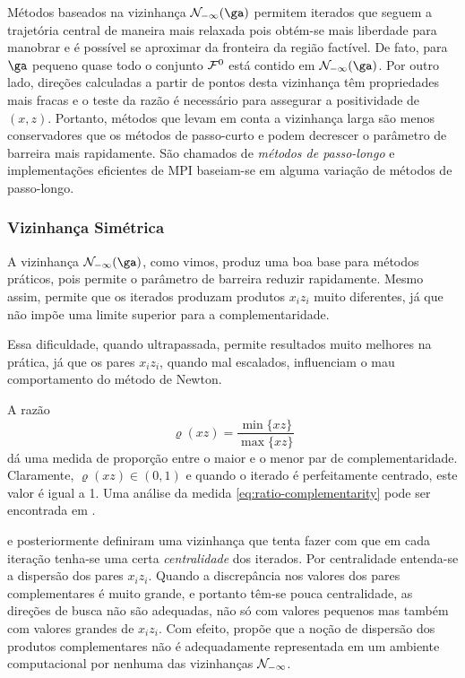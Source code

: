  
 Métodos baseados na vizinhança $\Nset_{-\infty}(\ga)$ permitem iterados que
 seguem a trajetória central de maneira mais relaxada  pois obtém-se mais
 liberdade para manobrar e é possível se aproximar da fronteira da região
 factível. De fato, para $\ga$ pequeno quase todo o conjunto $\mathcal{F}^0$ está
 contido em $\Nset_{-\infty}(\ga)$. Por outro lado, direções calculadas a partir
 de pontos desta vizinhança têm propriedades mais fracas e o teste da razão é
 necessário para assegurar a positividade de $(x,z)$. Portanto, métodos que
 levam em conta a vizinhança larga são menos conservadores que os métodos de
 passo-curto e podem decrescer o parâmetro de barreira mais rapidamente. São
 chamados de \emph{métodos de passo-longo}  e implementações eficientes de
 \ac{MPI} baseiam-se em alguma variação de métodos de passo-longo.
 
 \subsubsection{Vizinhança Simétrica}
\label{sec:symmetric-neig}  
 A vizinhança $\Nset_{-\infty}(\ga)$, como vimos,  produz uma boa base para
 métodos práticos, pois permite o parâmetro de barreira reduzir rapidamente.
 Mesmo assim, permite que os iterados produzam produtos $x_iz_i$ muito
 diferentes, já que não impõe uma limite superior para a complementaridade.
 
 Essa dificuldade, quando ultrapassada, permite resultados muito melhores na
 prática, já que os pares $x_iz_i$, quando mal escalados, influenciam o mau
 comportamento do método de Newton.
 
 A razão 
\begin{equation}
\label{eq:ratio-complementarity}
\varrho(xz) = \frac{\min\{xz\}}{\max\{xz\}}
\end{equation}
dá uma medida de proporção entre o maior e o menor par de complementaridade.
 Claramente, $\varrho(xz)\in(0,1)$ e quando o iterado é perfeitamente
centrado, este valor é igual a 1. Uma
análise da medida \eqref{eq:ratio-complementarity} pode ser encontrada em
\textcite{Jansen:1jv}.
 

\textcite{Gondzio:1996uw} e posteriormente \textcite{Colombo:2008wm,Colombo:2008ia}
definiram uma vizinhança que tenta fazer com que em cada iteração tenha-se uma
certa \emph{centralidade} dos iterados.  Por centralidade entenda-se a
dispersão dos pares $x_iz_i$. Quando a discrepância nos
valores dos pares complementares é muito grande, e portanto têm-se pouca
centralidade, as direções de busca não são adequadas, não só com valores
pequenos mas também com valores grandes de $x_iz_i$. Com efeito, \textcite[pp.
26]{Colombo:2008wm} propõe que a noção de dispersão dos produtos
complementares não é adequadamente  representada em um ambiente computacional
por nenhuma das  vizinhanças  $\mathcal{N}_{-\infty}$.



